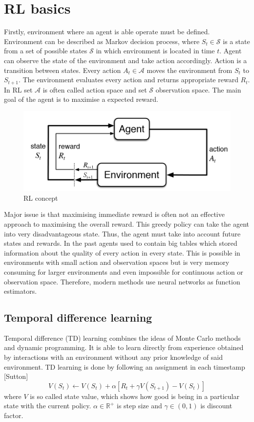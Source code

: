 \section{RL basics}
Firstly, environment where an agent is able operate must be defined. Environment can be described as Markov decision process, where $S_t \in \mathcal{S}$ is a state from a set of possible states $\mathcal{S}$ in which environment is located in time $t$. Agent can observe the state of the environment and take action accordingly. Action is a transition between states. Every action $A_t \in \mathcal{A}$ moves the environment from $S_t$ to $S_{t+1}$. The environment evaluates every action and returns appropriate reward $R_t$. In RL set $\mathcal{A}$ is often called action space and set $\mathcal{S}$ observation space. The main goal of the agent is to maximise a expected reward.

\begin{figure}[!h]
\centering
\includegraphics[scale=0.3]{fig/RL-concept.png}
\caption{RL concept}
\end{figure}

Major issue is that maximising immediate reward is often not an effective approach to maximising the overall reward. This greedy policy can take the agent into very disadvantageous state. Thus, the agent must take into account future states and rewards. In the past agents used to contain big tables which stored information about the quality of every action in every state. This is possible in environments with small action and observation spaces but is very memory consuming for larger environments and even impossible for continuous action or observation space. Therefore, modern methods use neural networks as function estimators.

\subsection{Temporal difference learning}
Temporal difference (TD) learning combines the ideas of Monte Carlo methods and dynamic programming. It is able to learn directly from experience obtained by interactions with an environment without any prior knowledge of said environment. TD learning is done by following an assignment in each timestamp [Sutton]
\begin{equation}
V(S_t) \gets V(S_t) + \alpha [R_{t} + \gamma V(S_{t+1}) - V(S_t)]
\end{equation}
where $V$ is so called state value, which shows how good is being in a particular state with the current policy. $\alpha \in \mathbb{R}^+$ is step size and $\gamma \in (0, 1)$ is discount factor.

